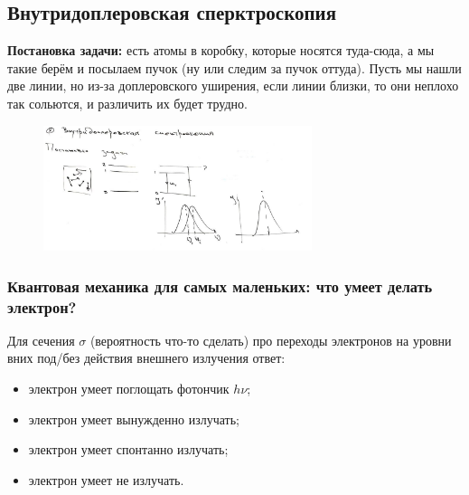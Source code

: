 \subsection*{Внутридоплеровская сперктроскопия}
\textbf{Постановка задачи:} есть атомы в коробку, которые носятся туда-сюда, а мы такие берём и посылаем пучок (ну или следим за пучок оттуда). Пусть мы нашли две линии, но из-за доплеровского уширения, если линии близки, то они неплохо так сольются, и различить их будет трудно.
\begin{figure}[h]
    \centering
    \includegraphics[width=0.7\textwidth]{img/lec_6.png}
\end{figure}

\subsubsection*{Квантовая механика для самых маленьких: что умеет делать электрон?}
Для сечения $\sigma$ (вероятность что-то сделать) про переходы электронов на уровни вних под/без действия внешнего излучения ответ:
\begin{itemize}
	\item электрон умеет поглощать фотончик $h \nu$;
	\item электрон умеет вынужденно излучать;
	\item электрон умеет спонтанно излучать;
	\item электрон умеет не излучать.
\end{itemize}
 
